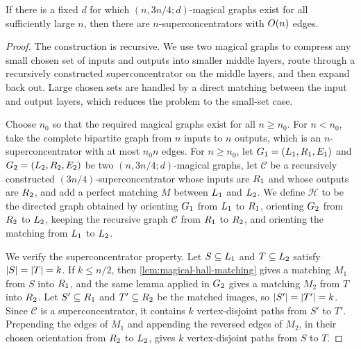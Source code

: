 \begin{theorem}
	\label{thm:magical-superconcentrators}
	If there is a fixed \(d\) for which \((n,3n/4;d)\)-magical graphs exist for all sufficiently large \(n\), then there are \(n\)-superconcentrators with \(\bigO(n)\) edges.
\end{theorem}

\begin{proof}
	The construction is recursive. We use two magical graphs to compress any small chosen set of inputs and outputs into smaller middle layers, route through a recursively constructed superconcentrator on the middle layers, and then expand back out. Large chosen sets are handled by a direct matching between the input and output layers, which reduces the problem to the small-set case.

	Choose \(n_0\) so that the required magical graphs exist for all \(n\geq n_0\). For \(n<n_0\), take the complete bipartite graph from \(n\) inputs to \(n\) outputs, which is an \(n\)-superconcentrator with at most \(n_0 n\) edges. For \(n\geq n_0\), let \(G_1=(L_1,R_1,E_1)\) and \(G_2=(L_2,R_2,E_2)\) be two \((n,3n/4;d)\)-magical graphs, let \(\mathcal{C}\) be a recursively constructed \((3n/4)\)-superconcentrator whose inputs are \(R_1\) and whose outputs are \(R_2\), and add a perfect matching \(M\) between \(L_1\) and \(L_2\). We define \(\mathcal{H}\) to be the directed graph obtained by orienting \(G_1\) from \(L_1\) to \(R_1\), orienting \(G_2\) from \(R_2\) to \(L_2\), keeping the recursive graph \(\mathcal{C}\) from \(R_1\) to \(R_2\), and orienting the matching from \(L_1\) to \(L_2\).

	We verify the superconcentrator property. Let \(S\subseteq L_1\) and \(T\subseteq L_2\) satisfy \(\lvert S\rvert=\lvert T\rvert=k\). If \(k\leq n/2\), then \cref{lem:magical-hall-matching} gives a matching \(M_1\) from \(S\) into \(R_1\), and the same lemma applied in \(G_2\) gives a matching \(M_2\) from \(T\) into \(R_2\). Let \(S'\subseteq R_1\) and \(T'\subseteq R_2\) be the matched images, so \(\lvert S'\rvert=\lvert T'\rvert=k\). Since \(\mathcal{C}\) is a superconcentrator, it contains \(k\) vertex-disjoint paths from \(S'\) to \(T'\). Prepending the edges of \(M_1\) and appending the reversed edges of \(M_2\), in their chosen orientation from \(R_2\) to \(L_2\), gives \(k\) vertex-disjoint paths from \(S\) to \(T\).


\end{proof}
